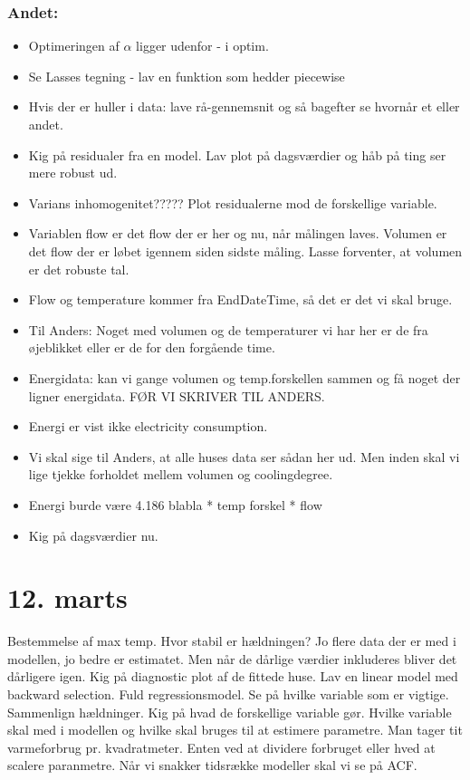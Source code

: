\subsubsection{Andet:}
\begin{itemize}
    \item Optimeringen af $\alpha$ ligger udenfor - i optim.
    \item Se Lasses tegning - lav en funktion som hedder piecewise
    \item Hvis der er huller i data: lave rå-gennemsnit og så bagefter se hvornår et eller andet.
    \item Kig på residualer fra en model. Lav plot på dagsværdier og håb på ting ser mere robust ud. 
    \item Varians inhomogenitet????? Plot residualerne mod de forskellige variable. 
    \item Variablen flow er det flow der er her og nu, når målingen laves. Volumen er det flow der er løbet igennem siden sidste måling. Lasse forventer, at volumen er det robuste tal. 
    \item Flow og temperature kommer fra EndDateTime, så det er det vi skal bruge. 
    \item Til Anders: Noget med volumen og de temperaturer vi har her er de fra øjeblikket eller er de for den forgående time. 
    \item Energidata: kan vi gange volumen og temp.forskellen sammen og få noget der ligner energidata. FØR VI SKRIVER TIL ANDERS. 
    \item Energi er vist ikke electricity consumption. 
    \item Vi skal sige til Anders, at alle huses data ser sådan her ud. Men inden skal vi lige tjekke forholdet mellem volumen og coolingdegree. 
    \item Energi burde være 4.186 blabla * temp forskel * flow
    \item Kig på dagsværdier nu. 
\end{itemize}

\pagebreak

\section{12. marts}
\noindent Bestemmelse af max temp. Hvor stabil er hældningen? Jo flere data der er med i modellen, jo bedre er estimatet. Men når de dårlige
værdier inkluderes bliver det dårligere igen.
Kig på diagnostic plot af de fittede huse. 
Lav en linear model med backward selection. Fuld regressionsmodel. Se på hvilke variable som er vigtige. Sammenlign hældninger.
Kig på hvad de forskellige variable gør. Hvilke variable skal med i modellen og hvilke skal bruges til at estimere parametre.
Man tager tit varmeforbrug pr. kvadratmeter. Enten ved at dividere forbruget eller hved at scalere paranmetre.
Når vi snakker tidsrække modeller skal vi se på ACF.

